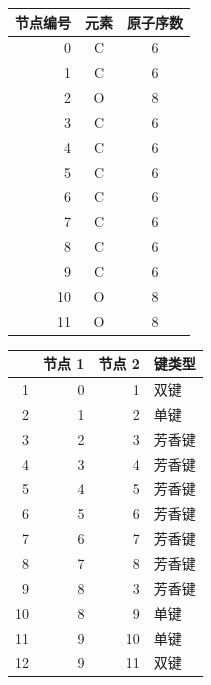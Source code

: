 \begin{table}[htbp]
  \centering
  \begin{tabular}{rcc}
    \toprule
    节点编号 & 元素 & 原子序数 \\
    \midrule
    0 & C & 6 \\
    1 & C & 6 \\
    2 & O & 8 \\
    3 & C & 6 \\
    4 & C & 6 \\
    5 & C & 6 \\
    6 & C & 6 \\
    7 & C & 6 \\
    8 & C & 6 \\
    9 & C & 6 \\
    10 & O & 8 \\
    11 & O & 8 \\
    \bottomrule
  \end{tabular}
\end{table}
\begin{table}[htbp]
  \centering
  \begin{tabular}{rrrl}
    \toprule
      & 节点 1 & 节点 2 & 键类型 \\
    \midrule
     1 & 0 & 1 & 双键 \\
     2 & 1 & 2 & 单键 \\
     3 & 2 & 3 & 芳香键 \\
     4 & 3 & 4 & 芳香键 \\
     5 & 4 & 5 & 芳香键 \\
     6 & 5 & 6 & 芳香键 \\
     7 & 6 & 7 & 芳香键 \\
     8 & 7 & 8 & 芳香键 \\
     9 & 8 & 3 & 芳香键 \\
    10 & 8 & 9 & 单键 \\
    11 & 9 & 10 & 单键 \\
    12 & 9 & 11 & 双键 \\
    \bottomrule
  \end{tabular}
\end{table}

